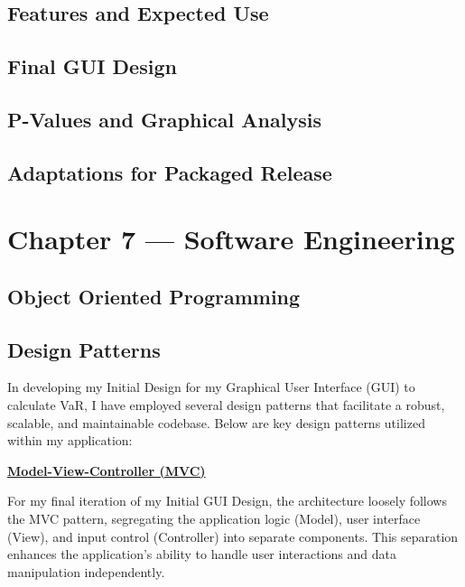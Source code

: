 \documentclass{article}
\begin{document}
\subsection{Features and Expected Use}


\subsection{Final GUI Design}

\subsection{P-Values and Graphical Analysis}


\subsection{Adaptations for Packaged Release}






\section{Chapter 7 --- Software Engineering}

\subsection{Object Oriented Programming}

\subsection{Design Patterns}

In developing my Initial Design for my Graphical User Interface (GUI) to calculate VaR, I have employed several design patterns that facilitate a robust, scalable, and maintainable codebase. Below are key design patterns utilized within my application:\\\vspace{0.3cm}

\underline{\textbf{Model-View-Controller (MVC)}}\\\vspace{0.3cm}

For my final iteration of my Initial GUI Design, the architecture loosely follows the MVC pattern, segregating the application logic (Model), user interface (View), and input control (Controller) into separate components. This separation enhances the application's ability to handle user interactions and data manipulation independently.
\end{document}
